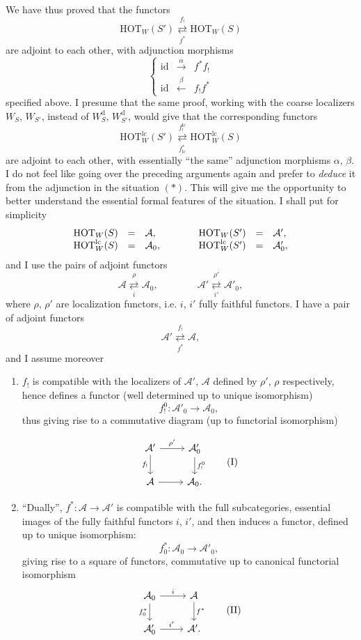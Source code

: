 \documentclass[11pt]{article}
\newcommand{\printedpage}[1]{\marginpar{\footnotesize p.~#1}}
\newcommand{\msp}[1]{\marginpar{\footnotesize [#1]}}
\newcommand{\HOT}{\mathrm{HOT}}
\newcommand{\id}{\mathrm{id}}
\newcommand{\cA}{\mathcal{A}}
\newcommand{\dd}{\mathrm{d}}
\newcommand{\lc}{\mathrm{lc}}
\newcommand{\adj}[2]{\mathrel{\underset{#2}{\overset{#1}{\rightleftarrows}}}}
\begin{document}
\printedpage{90}

\msp{page 147}
We have thus proved that the functors
\[
\HOT_W(S') \adj{f_!}{f^*} \HOT_W(S)
\tag*{$(*)$}
\]
are adjoint to each other, with adjunction morphisms
\[
\left\{
\begin{array}{lcl}
\id & \xrightarrow{\ \alpha\ } & f^*f_! \\[1ex]
\id & \xleftarrow{\ \beta\ } & f_!f^*
\end{array}
\right.
\]
specified above. I presume that the same proof, working with the coarse localizers $W_S$, $W_{S'}$, instead of $W^{\dd}_S$, $W^{\dd}_{S'}$, would give that the corresponding functors
\[
\HOT^{\lc}_W(S') \adj{f_!^{\lc}}{f^*_{\lc}} \HOT^{\lc}_W(S)
\tag*{$(**)$}
\]
are adjoint to each other, with essentially ``the same'' adjunction morphisms $\alpha$, $\beta$. I do not feel like going over the preceding arguments again and prefer to \textit{deduce} it from the adjunction in the situation $(*)$. This will give me the opportunity to better understand the essential formal features of the situation. I shall put for simplicity
\msp{page 148}
\[
\begin{array}{rcl@{\qquad\qquad}rcl}
\HOT_W(S) & = & \cA, & \HOT_W(S') & = & \cA', \\
\HOT^{\lc}_W(S) & = & \cA_0, & \HOT^{\lc}_W(S') & = & \cA'_0,
\end{array}
\]
and I use the pairs of adjoint functors
\[
\cA \adj{\rho}{i} \cA_0, \qquad\qquad \cA' \adj{\rho'}{i'} \cA'_0,
\]
where $\rho$, $\rho'$ are localization functors, i.e. $i$, $i'$ fully faithful functors. I have a pair of adjoint functors
\[
\cA' \adj{f_!}{f^*} \cA,
\]
and I assume moreover

\begin{enumerate}
\item[a)] $f_!$ is compatible with the localizers of $\cA'$, $\cA$ defined by $\rho'$, $\rho$ respectively, hence defines a functor (well determined up to unique isomorphism)
\[
f_!^0 : \cA'_0 \longrightarrow \cA_0,
\]
thus giving rise to a commutative diagram (up to functorial isomorphism)


\printedpage{91}
\[
\begin{tikzcd}
\cA' \arrow[r, "\rho'"] \arrow[d, "f_!"'] & \cA'_0 \arrow[d, "f_!^0"] \\
\cA \arrow[r] & \cA_0.
\end{tikzcd}
\tag*{(I)}
\]


\item[b)] ``Dually'', $f^* : \cA \longrightarrow \cA'$ is compatible with the full subcategories, essential images of the fully faithful functors $i$, $i'$, and then induces
\msp{page 149}
a functor, defined up to unique isomorphism:
\[
f_0^* : \cA_0 \longrightarrow \cA'_0,
\]
giving rise to a square of functors, commutative up to canonical functorial isomorphism
\[
\begin{tikzcd}
\cA_0 \arrow[r, "i"] \arrow[d, "f_0^*"'] & \cA \arrow[d, "f^*"] \\
\cA'_0 \arrow[r, "i'"] & \cA'.
\end{tikzcd}
\tag*{(II)}
\]
\end{enumerate}
\end{document}
